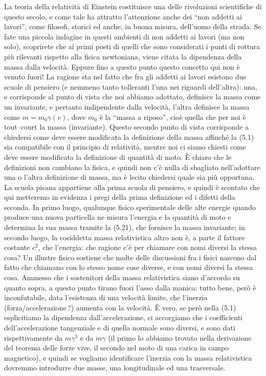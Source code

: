 La teoria della relativit\`a di Einstein costituisce una delle rivoluzioni
scientifiche di questo secolo, e come tale ha attratto l'attenzione anche dei
``non addetti ai lavori'', come filosofi, storici ed anche, in buona misura,
dell'uomo della strada. Se fate una piccola indagine in questi ambienti di non
addetti ai lavori (ma non solo), scoprirete che ai primi posti di quelli che
sono considerati i punti di rottura pi\`u rilevanti rispetto alla fisica
newtoniana, viene citata la dipendenza della massa dalla velocit\`a. Eppure fino
a questo punto questo concetto qui non \`e venuto fuori! La ragione sta nel
fatto che fra gli addetti ai lavori esistono due scuole di pensiero (e nemmeno
tanto tolleranti l'una nei riguardi dell'altra): una, e corrisponde al punto di
vista che noi abbiamo adottato, definisce la massa come un invariante, e
pertanto indipendente dalla velocit\`a, l'altra definisce la massa come
$m=m_0\gamma(v)$, dove $m_0$ \`e la ``massa a riposo'', cio\`e quella che per
noi \`e tout--court la massa (invariante). Questo secondo punto di vista
corrisponde a chiedersi come deve essere modificata la definizione della massa
affinch\'e la (5.1) sia compatibile con il principio di relativit\`a, mentre noi
ci siamo chiesti come deve essere modificata la definizione di quantit\`a di
moto. \`E chiaro che le definizioni non cambiano la fisica, e quindi non c'\`e
nulla di sbagliato nell'adottare una o l'altra definizione di massa, ma \`e
lecito chiedersi quale sia pi\`u opportuna. La scuola pisana appartiene alla
prima scuola di pensiero, e quindi \`e scontato che qui metteremo in evidenza i
pregi della prima definizione ed i difetti della seconda. In primo luogo,
qualunque fisico sperimentale delle alte energie quando produce una nuova
particella ne misura l'energia e la quantit\`a di moto e determina la sua massa
tramite la (5.21), che fornisce la massa invariante; in secondo luogo, la
cosiddetta massa relativistica altro non \`e, a parte il fattore costante $c^2$,
che l'energia: che ragione c'\`e per chiamare con nomi diversi la stessa cosa?
Un illustre fisico sostiene che molte delle discussioni fra i fisici nascono dal
fatto che chiamano con lo stesso nome cose diverse, e con nomi diversi la stessa
cosa. Ammesso che i sostenitori della massa relativistica siano d'accordo su
quanto sopra, a questo punto tirano fuori l'asso dalla manica: tutto bene,
per\`o \`e inconfutabile, data l'esistenza di una velocit\`a limite, che
l'inerzia (forza/accelerazione\,?) aumenta con la velocit\`a. \`E vero, se
per\`o nella (5.1) esplicitiamo la dipendenza dall'accelerazione, ci accorgiamo
che i coefficienti dell'accelerazione tangenziale e di quella normale sono
diversi, e sono dati rispettivamente da $m\gamma^3$ e da $m\gamma$ (il primo lo
abbiamo trovato nella derivazione del teorema delle forze vive, il secondo nel
moto di una carica in campo magnetico), e quindi se vogliamo identificare
l'inerzia con la massa relativistica dovremmo introdurre due masse, una
longitudinale ed una trasversale.

